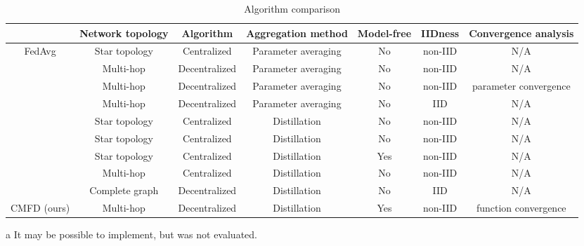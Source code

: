 \documentclass[journal]{IEEEtran}
\begin{document}
\begin{table*}[!t]
\centering
\begin{threeparttable}
\caption{Algorithm comparison} \label{tbl:comparison}
\begin{tabular}{ccccccc}
\toprule
& Network topology & Algorithm & Aggregation method & Model-free & IIDness & Convergence analysis \\
\midrule
FedAvg \cite{mcmahan2016communication}
  & Star topology & Centralized & Parameter averaging & No & non-IID & N/A \\
\cite{savazzi2020federated}
  & Multi-hop & Decentralized & Parameter averaging & No & non-IID & N/A \\
\cite{lalitha2019peer,lian2017can,niwa2020edge}
  & Multi-hop & Decentralized & Parameter averaging & No & non-IID & parameter convergence \\
\cite{sato2020network}
  & Multi-hop & Decentralized & Parameter averaging & No & IID & N/A \\
\cite{oh2020mix2fld}
  & Star topology & Centralized & Distillation & No & non-IID & N/A \\
\cite{ahn2019wireless,itahara2021distillation,jeong2018communication}
  & Star topology & Centralized & Distillation & No\tnote{a} & non-IID & N/A \\
\cite{chang2019cronus,li2019fedmd,lin2020ensemble}
  & Star topology & Centralized & Distillation & Yes & non-IID & N/A \\
\cite{jeong2019multi}
  & Multi-hop & Centralized & Distillation & No & non-IID & N/A \\
\cite{anil2018large,zhang2018deep}
  & Complete graph & Decentralized & Distillation & No\tnote{a} & IID & N/A \\
CMFD (ours)
  & Multi-hop & Decentralized & Distillation & Yes & non-IID & function convergence \\
\bottomrule
\end{tabular}
\begin{tablenotes}
  \item[a] It may be possible to implement, but was not evaluated.
\end{tablenotes}
\end{threeparttable}
\end{table*}
\end{document}
